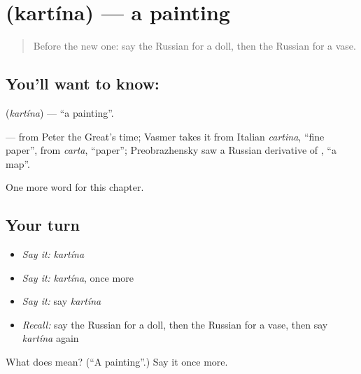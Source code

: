 \section[\texorpdfstring{\ru{картина} (kartína)}{картина (kartína)}]{ (kartína) — a painting}

\label{lesson:RU-C221-kartina}



\begin{quote}
Before the new one: say the Russian for a doll, then the Russian for a vase.
\end{quote}

\subsection*{You'll want to know: }
\textbf{} (\emph{kartína}) — \textquotedblleft{}a painting\textquotedblright{}.

\begin{cousinweb}
\textbf{} — from Peter the Great's time; Vasmer takes it from Italian \emph{cartina}, \textquotedblleft{}fine paper\textquotedblright{}, from \emph{carta}, \textquotedblleft{}paper\textquotedblright{}; Preobrazhensky saw a Russian derivative of \emph{}, \textquotedblleft{}a map\textquotedblright{}.
\end{cousinweb}

\begin{grammarlens}[title={What you've built}]
One more word for this chapter.
\end{grammarlens}

\subsection*{Your turn}
\begin{itemize}
\raggedright
  \item \emph{Say it:} \emph{kartína}
  \item \emph{Say it:} \emph{kartína}, once more
  \item \emph{Say it:} say \emph{kartína}
  \item \emph{Recall:} say the Russian for a doll, then the Russian for a vase, then say \emph{kartína} again
\end{itemize}

\begin{tcolorbox}[breakable,colback=teal!4,colframe=teal!35!black,title={Before you move on}]
What does  mean? (\textquotedblleft{}A painting\textquotedblright{}.) Say it once more.
\end{tcolorbox}
